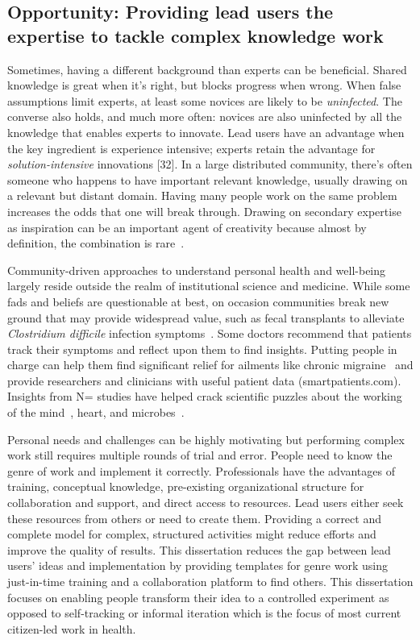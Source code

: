 \subsection{Opportunity: Providing lead users the expertise to tackle complex knowledge work}
Sometimes, having a different background
 than experts can be beneficial. Shared knowledge is great when it’s right, but blocks progress
 when wrong. When false assumptions limit experts, at least some novices are likely to be 
\textit{uninfected}. The converse also holds, and much more often: novices are also uninfected
by all the knowledge that enables experts to innovate. Lead users have an advantage when the key ingredient is experience intensive; experts retain the
advantage for \textit{solution-intensive} innovations [32]. In a large distributed community, 
there’s often someone who happens to have important relevant knowledge, usually 
drawing on a relevant but distant domain. Having many people work on the same problem 
increases the odds that one will break through. Drawing on secondary expertise as 
inspiration can be an important agent of creativity because almost by definition, the
 combination is rare~\cite{Boden2004}. 

Community-driven approaches to understand personal
health and well-being largely reside outside the realm
of institutional science and medicine. While some fads and beliefs are 
questionable at best, on occasion communities
break new ground that may provide widespread value,
such as fecal transplants to alleviate \textit{Clostridium difficile} infection
symptoms~\cite{Brandt2012}. Some doctors recommend that patients
track their symptoms and reflect upon them to find
insights. Putting people in charge can help them find significant
relief for ailments like chronic migraine~\cite{Gawande2017} and provide
researchers and clinicians with useful patient data
(smartpatients.com). Insights from N\Hair= studies have helped
crack scientific puzzles about the working of the mind~\cite{V.S.Ramachandran1998},
heart, and microbes~\cite{Weisse2012}. 

Personal needs and challenges can be highly motivating but performing complex work still requires multiple rounds of trial and error. 
People need to know the genre of work and implement it correctly.  Professionals have the advantages of training, conceptual knowledge, 
pre-existing organizational structure for 
collaboration and support, and direct access to resources. Lead users either seek these resources from others or need to create them. 
Providing a correct and complete model for complex, structured activities might reduce efforts and improve the quality of results.
This dissertation reduces the gap between lead users' ideas and implementation by providing templates for 
genre work using just-in-time training and a collaboration platform to find others. This dissertation focuses on enabling people transform their idea to a controlled experiment as opposed to 
self-tracking or informal iteration which is the focus of most current citizen-led work in health.

